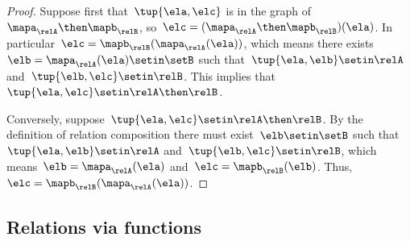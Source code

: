 \begin{proof}
    Suppose first that~$\tup{\ela, \elc}$ is in the graph of~$\mapa_\relA \then \mapb_\relB$, so~$\elc = (\mapa_\relA \then \mapb_\relB)(\ela)$.
    In particular~$\elc =  \mapb_\relB(\mapa_\relA(\ela))$, which means there exists~$\elb = \mapa_\relA(\ela) \setin \setB$ such that~$\tup{\ela, \elb} \setin \relA$ and~$\tup{\elb, \elc} \setin \relB$.
    This implies that~$\tup{\ela, \elc} \setin \relA \then \relB$.

    Conversely, suppose~$\tup{\ela, \elc} \setin \relA \then \relB$.
    By the definition of relation composition there must exist~$\elb \setin \setB$ such that~$\tup{\ela, \elb} \setin \relA$ and~$\tup{\elb, \elc} \setin \relB$, which means~$\elb = \mapa_\relA(\ela)$ and~$\elc = \mapb_\relB(\elb)$.
    Thus,~$\elc = \mapb_\relB(\mapa_\relA(\ela))$.
\end{proof}

\subsection{Relations via functions}

